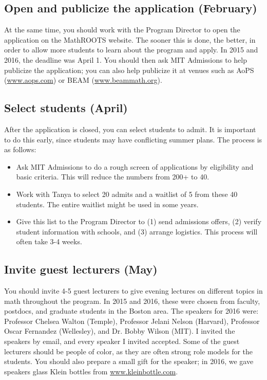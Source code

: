 \documentclass[10pt]{amsart}
\begin{document}
\subsection{Open and publicize the application (February)}

At the same time, you should work with the Program Director to open the application on the MathROOTS website.  The sooner this is done, the better, in order to allow more students to learn about the program and apply.  In 2015 and 2016, the deadline was April 1.  You should then ask MIT Admissions to help publicize the application; you can also help publicize it at venues such as AoPS (\url{www.aops.com}) or BEAM (\url{www.beammath.org}).  

\subsection{Select students (April)}

After the application is closed, you can select students to admit.  It is important to do this early, since students may have conflicting summer plans.  The process is as follows:

\begin{itemize}
\item Ask MIT Admissions to do a rough screen of applications by eligibility and basic criteria.  This will reduce the numbers from 200+ to 40.

\item Work with Tanya to select 20 admits and a waitlist of 5 from these 40 students.  The entire waitlist might be used in some years.

\item Give this list to the Program Director to (1) send admissions offers, (2) verify student information with schools, and (3) arrange logistics.  This process will often take 3-4 weeks.
\end{itemize}

\subsection{Invite guest lecturers (May)}

You should invite 4-5 guest lecturers to give evening lectures on different topics in math throughout the program.  In 2015 and 2016, these were chosen from faculty, postdocs, and graduate students in the Boston area.  The speakers for 2016 were: Professor Chelsea Walton (Temple), Professor Jelani Nelson (Harvard), Professor Oscar Fernandez (Wellesley), and Dr. Bobby Wilson (MIT).  I invited the speakers by email, and every speaker I invited accepted. Some of the guest lecturers should be people of color, as they are often strong role models for the students.  You should also prepare a small gift for the speaker; in 2016, we gave speakers glass Klein bottles from \url{www.kleinbottle.com}.
\end{document}
